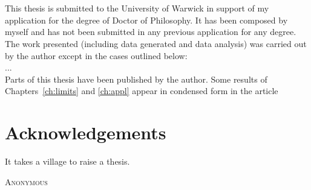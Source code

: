 \documentclass[oneside]{scrbook} %
\theoremstyle{definition}
\newcommand{\1}[1]{\mathbbm{1}_{#1}} %
\begin{document}




%
\chapter*{} %

This thesis is submitted to the University of Warwick in support of my application for the degree of Doctor of Philosophy. It has been composed by myself and has not been submitted in any previous application for any degree.
\\[5pt]
The work presented (including data generated and data analysis) was carried out by the author except in the cases outlined below:
\\
...
\\[5pt]
Parts of this thesis have been published by the author.
Some results of Chapters~\ref{ch:limits} and \ref{ch:appl} appear in condensed form in the article
\\
%




\chapter*{Acknowledgements}
\epigraph{
It takes a village to raise a thesis.
}
{\textsc{Anonymous}} 
\end{document}
